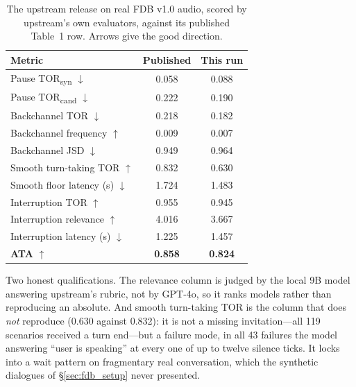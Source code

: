 \documentclass[conference]{IEEEtran}
\begin{document}
\begin{table}[t]
\centering
\caption{The upstream release on real FDB v1.0 audio, scored by upstream's own
evaluators, against its published Table~1 row. Arrows give the good direction.}
\label{tab:audio_ref}
\footnotesize
\begin{tabular}{lcc}
\toprule
Metric & Published & This run \\
\midrule
Pause TOR\textsubscript{syn} $\downarrow$    & 0.058 & 0.088 \\
Pause TOR\textsubscript{cand} $\downarrow$   & 0.222 & 0.190 \\
Backchannel TOR $\downarrow$                 & 0.218 & 0.182 \\
Backchannel frequency $\uparrow$             & 0.009 & 0.007 \\
Backchannel JSD $\downarrow$                 & 0.949 & 0.964 \\
Smooth turn-taking TOR $\uparrow$            & 0.832 & 0.630 \\
Smooth floor latency (s) $\downarrow$        & 1.724 & 1.483 \\
Interruption TOR $\uparrow$                  & 0.955 & 0.945 \\
Interruption relevance $\uparrow$            & 4.016 & 3.667 \\
Interruption latency (s) $\downarrow$        & 1.225 & 1.457 \\
\textbf{ATA} $\uparrow$                      & \textbf{0.858} & \textbf{0.824} \\
\bottomrule
\end{tabular}
\end{table}

Two honest qualifications. The relevance column is judged by the local 9B model
answering upstream's rubric, not by GPT-4o, so it ranks models rather than
reproducing an absolute. And smooth turn-taking TOR is the column that does
\emph{not} reproduce (0.630 against 0.832): it is not a missing invitation---all
119 scenarios received a turn end---but a failure mode, in all 43 failures the
model answering ``user is speaking'' at every one of up to twelve silence ticks.
It locks into a wait pattern on fragmentary real conversation, which the synthetic
dialogues of \S\ref{sec:fdb_setup} never presented.
\end{document}
